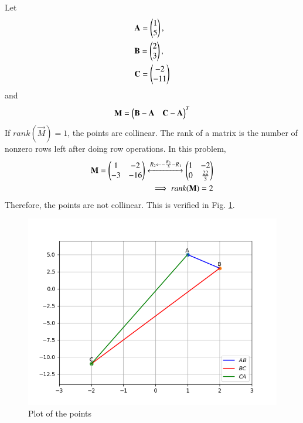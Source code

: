 
Let
\begin{align}
    &\mathbf{A} = \begin{pmatrix}1\\5\end{pmatrix},\\
    &\mathbf{B} = \begin{pmatrix}2\\3\end{pmatrix},\\
    &\mathbf{C} = \begin{pmatrix}-2\\-11\end{pmatrix}
\end{align}
and 
\begin{align}
    \mathbf{M}=\begin{pmatrix}\mathbf{B-A} & \mathbf{C-A}\end{pmatrix}^T
\end{align}
If $rank(\vec{M}) = 1$, the points are collinear.  The rank of a matrix is the number of nonzero rows left after doing row operations.  In this problem, 
\begin{align}
    \mathbf{M} = \begin{pmatrix}1 & -2\\-3 & -16\end{pmatrix}\xleftrightarrow {R_2\leftarrow -\frac{R_2}{3}-R_1}\begin{pmatrix}1 & -2\\0 & \frac{22}{3}\end{pmatrix}
    \\
    \implies rank(\mathbf{M}) = 2
    \end{align}
Therefore, the points are not collinear.  This is verified in Fig. \ref{aug/2/7/plot}.

\begin{figure}[!ht]
    \centering
    \includegraphics[width=\columnwidth]{solutions/aug/2/7/figure/figure.png}
    \caption{Plot of the points}
    \label{aug/2/7/plot}
    \end{figure}
